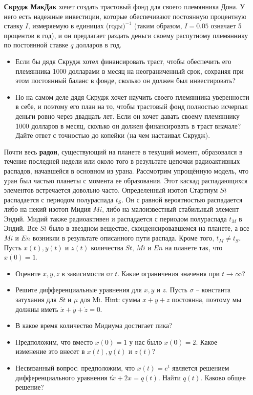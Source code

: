\begin{task}
\textbf{Скрудж МакДак} хочет создать трастовый фонд для своего племянника Дона. У него есть надежные инвестиции, которые обеспечивают постоянную процентную ставку $I$, измеряемую в единицах (годы$)^{−1}$ (таким образом, $I = 0.05$ означает 5 процентов в год), и он предлагает раздать деньги своему распутному племяннику по постоянной ставке $q$ долларов в год.
\begin{itemize}
    \item Если бы дядя Скрудж хотел финансировать траст, чтобы обеспечить его племянника 1000 долларами в месяц на неограниченный срок, сохраняя при этом постоянный баланс в фонде, сколько он должен был инвестировать?
    \item Но на самом деле дядя Скрудж хочет научить своего племянника уверенности в себе, и поэтому его план на то, чтобы трастовый фонд полностью исчерпал деньги ровно через двадцать лет. Если он хочет давать своему племяннику 1000 долларов в месяц, сколько он должен финансировать в траст вначале? Дайте ответ с точностью до копейки (на чем настаивал Скрудж).
\end{itemize}

\end{task}

\begin{task}
Почти весь \textbf{радон}, существующий на планете в текущий момент, образовался в течение последней недели или около того в результате цепочки радиоактивных распадов, начавшейся в основном из урана. Рассмотрим упрощённую модель, что уран был частью планеты с момента ее образования. Этот каскад распадающихся элементов встречается довольно часто. 
Определенный изотоп Стартиум $St$ распадается с периодом полураспада $t_S$. Он с равной вероятностью распадается либо на некий изотоп Мидия $Mi$, либо на малоизвестный стабильный элемент Эндий. Мидий также радиоактивен и распадается с периодом полураспада $t_M$ в Эндий. Все $St$ было в звездном веществе, сконденсировавшемся на планете, а все $Mi$ и $En$ возникли в результате описанного пути распада. Кроме того, $t_M \neq t_S$.
Пусть $x(t), y(t)$ и $z(t)$ количества $St$, $Mi$ и $En$ на планете так, что $x(0) = 1$.
\begin{itemize}
    \item Оцените $x, y, z$ в зависимости от $t$. Какие ограничения
значения при $t \to \infty$?
    \item Решите дифференциальные уравнения для $x, y$ и $z$. Пусть $\sigma$ -- константа затухания для $St$ и $\mu$ для Mi. Hint: сумма $x+y+z$ постоянна, поэтому мы должны иметь $\dot{x}+\dot{y} +\dot{z} = 0$.
    \item В какое время количество Мидиума достигает пика?
    \item Предположим, что вместо $x(0) = 1$ у нас было $x(0) = 2$. Какое изменение это внесет в $x(t), y(t)$ и $z(t)$?
    \item Несвязанный вопрос: предположим, что $x(t) = e^t$ является решением дифференциального уравнения $t\dot{x} + 2x = q(t)$. Найти $q(t)$. Каково общее решение?
\end{itemize} 

\end{task}

